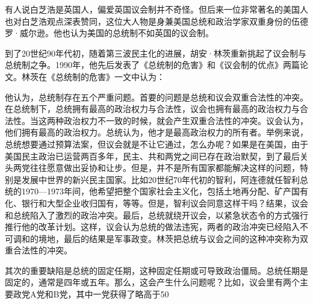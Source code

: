 有人说白芝浩是英国人，偏爱英国议会制并不奇怪。但后来一位非常著名的美国人也对白芝浩观点深表赞同，这位大人物是身兼美国总统和政治学家双重身份的伍德罗·威尔逊。他也认为美国的总统制不如英国的议会制。

到了20世纪90年代初，随着第三波民主化的进展，胡安·林茨重新挑起了议会制与总统制之争。1990年，他先后发表了《总统制的危害》和《议会制的优点》两篇论文。林茨在《总统制的危害》一文中认为：


他认为，总统制存在五个严重问题。首要的问题是总统和议会双重合法性的冲突。在总统制下，总统拥有最高的政治权力与合法性，议会也拥有最高的政治权力与合法性。当这两种政治权力不一致的时候，就会产生双重合法性的冲突。议会认为，他们拥有最高的政治权力。总统认为，他才是最高政治权力的所有者。举例来说，总统想要通过预算法案，但议会就是不让它通过，怎么办呢？如果是在美国，由于美国民主政治已运营两百多年，民主、共和两党之间已存在政治默契，到了最后关头两党往往愿意做出妥协和让步。但是，并不是所有国家都能解决这样的问题，特别是发展中世界的新兴民主国家。比如20世纪70年代初的智利，阿连德就任智利总统的1970—1973年间，他希望把整个国家社会主义化，包括土地再分配、矿产国有化、银行和大型企业收归国有，等等。但是，智利议会同意这样干吗？结果，议会和总统陷入了激烈的政治冲突。最后，总统就绕开议会，以紧急状态令的方式强行推行他的改革计划。这样，议会认为总统的做法违宪，两者的政治冲突已经陷入不可调和的境地，最后的结果是军事政变。林茨把总统与议会之间的这种冲突称为双重合法性的冲突。

其次的重要缺陷是总统的固定任期，这种固定任期或可导致政治僵局。总统任期是固定的，通常是四年或五年。那么，这会产生什么问题呢？比如，议会里有两个主要政党A党和B党，其中一党获得了略高于50%

